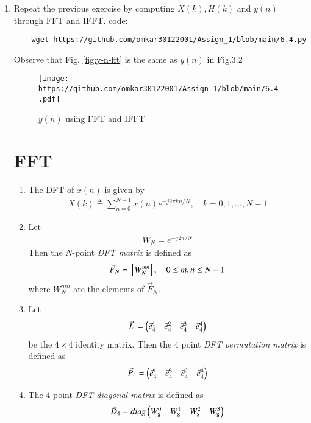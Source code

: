 \documentclass[journal,12pt,twocolumn]{IEEEtran}
\renewcommand\thesection{\arabic{section}}
\begin{document}
\begin{enumerate}[label=\thesection.\arabic*
	,ref=\thesection.\theenumi]
\item Repeat the previous exercise by computing $X(k), H(k)$ and $y(n)$ through FFT and 
IFFT.
\solution code:
\begin{lstlisting}
	wget https://github.com/omkar30122001/Assign_1/blob/main/6.4.py
\end{lstlisting}
Observe that Fig. \eqref{fig:y-n-fft} is the same as $y(n)$ in Fig.3.2
\begin{figure}
	\centering
	\texttt{[image: https://github.com/omkar30122001/Assign\_1/blob/main/6.4.pdf]}
	\caption{$y(n)$ using FFT and IFFT}
	\label{fig:y-n-fft}
\end{figure}
%
\section{FFT}
\begin{enumerate}[label=\arabic*.,ref=\thesection.\theenumi]
\item The DFT of $x(n)$ is given by
\begin{align}
	X(k) \triangleq \sum_{n=0}^{N-1} x(n) e^{-j 2 \pi k n / N}, \quad k=0,1, \ldots, N-1
\end{align}
\item Let 
\begin{align}
	W_{N} = e^{-j2\pi/N} 
\end{align}
Then the $N$-point {\em DFT matrix} is defined as 
\begin{align}
	\vec{F}_{N} = {}\left[W_{N}^{mn}\right], \quad 0 \le m,n \le N-1 
\end{align}
where $W_{N}^{mn}$ are the elements of $\vec{F}_{N}$.
\item Let 
\begin{align}
	\vec{I}_4 = \begin{pmatrix}\vec{e}_4^{1} &\vec{e}_4^{2} &\vec{e}_4^{3} &\vec{e}_4^{4} \end{pmatrix}
\end{align}
be the $4\times 4$ identity matrix.  Then the 4 point {\em DFT permutation matrix} is defined as 
\begin{align}
	\vec{P}_4 = \begin{pmatrix}\vec{e}_4^{1} &\vec{e}_4^{3} &\vec{e}_4^{2} &\vec{e}_4^{4} \end{pmatrix}
\end{align}
\item The 4 point {\em DFT diagonal matrix} is defined as 
\begin{align}
	\vec{D}_4 = diag\myvec{W_{8}^{0} & W_{8}^{1} & W_{8}^{2} & W_{8}^{3}}

\end{align}
\end{enumerate}
\end{enumerate}
\end{document}
